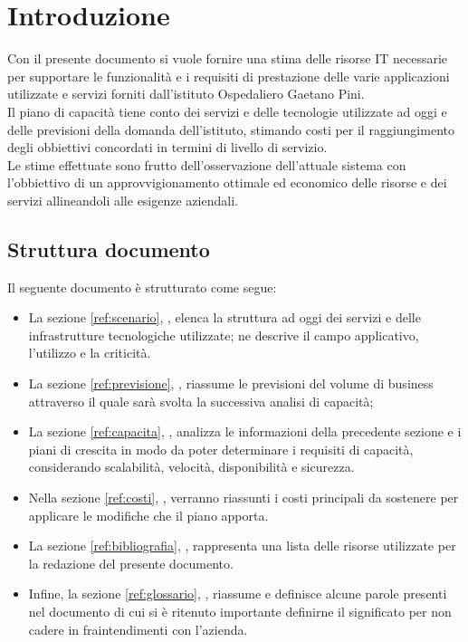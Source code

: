 \newpage

\section{Introduzione} \label{intro}
	Con il presente documento si vuole fornire una stima delle risorse IT necessarie per supportare le funzionalità e i requisiti di prestazione delle varie applicazioni utilizzate e servizi forniti dall'istituto  Ospedaliero Gaetano Pini.\\
	Il piano di capacità tiene conto dei servizi e delle tecnologie utilizzate ad oggi e delle previsioni della domanda dell'istituto, stimando costi per il raggiungimento degli obbiettivi concordati in termini di livello di servizio. \\
	Le stime effettuate sono frutto dell'osservazione dell'attuale sistema con l'obbiettivo di un approvvigionamento ottimale ed economico delle risorse e dei servizi allineandoli alle esigenze aziendali.
	
	\subsection{Struttura documento}
	Il seguente documento è strutturato come segue:
	\begin{itemize}
		\item La sezione \ref{ref:scenario}, , elenca la struttura ad oggi dei servizi e delle infrastrutture tecnologiche utilizzate; ne descrive il campo applicativo, l'utilizzo e la criticità.
		\item La sezione \ref{ref:previsione}, ,  riassume le previsioni del volume di business attraverso il quale sarà svolta la successiva analisi di capacità;
		\item La sezione \ref{ref:capacita}, , analizza le informazioni della precedente sezione e i piani di crescita in modo da poter determinare i requisiti di capacità, considerando scalabilità, velocità, disponibilità e sicurezza.
		\item Nella sezione \ref{ref:costi}, , verranno riassunti i costi principali da sostenere per applicare le modifiche che il piano apporta.
		\item La sezione \ref{ref:bibliografia}, , rappresenta una lista delle risorse utilizzate per la redazione del presente documento.
		\item Infine, la sezione \ref{ref:glossario}, , riassume e definisce alcune parole presenti nel documento di cui si è ritenuto importante definirne il significato per non cadere in fraintendimenti con l'azienda.
	\end{itemize}